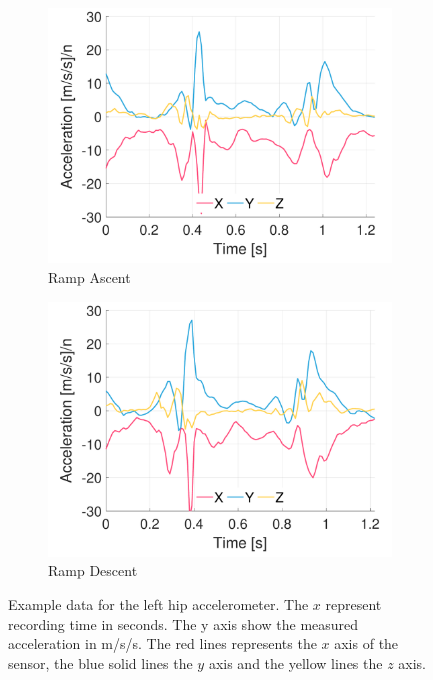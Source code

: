 \begin{figure}[p]
    \begin{subfigure}[b]{0.49\textwidth}
         \centering
         \includegraphics[width=\textwidth]{content/3-Methods/example-data/ch3_example_data_subject_01_l_hip_accel_activity_ramp_up.pdf}
         \caption{Ramp Ascent}
    \end{subfigure}
    \begin{subfigure}[b]{0.49\textwidth}
         \centering
         \includegraphics[width=\textwidth]{content/3-Methods/example-data/ch3_example_data_subject_01_l_hip_accel_activity_ramp_down.pdf}
         \caption{Ramp Descent}
    \end{subfigure}
    \caption[Example left hip accelerometer data]{Example data for the left hip accelerometer. The $x$ represent recording time in seconds. The y axis show the measured acceleration in m/s/s. The red lines represents the $x$ axis of the sensor, the blue solid lines the $y$ axis and the yellow lines the $z$ axis.}
    \label{fig:example-left-hip-accel-sensor-data}
\end{figure}

